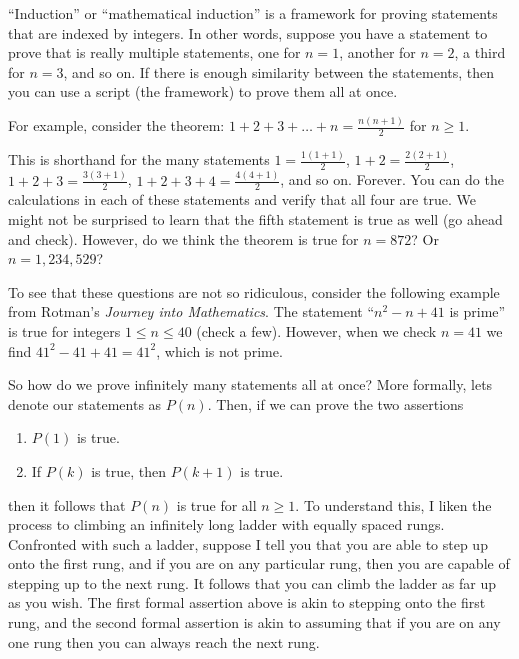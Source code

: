 \begin{para}``Induction'' or ``mathematical induction'' is a framework for proving statements that are indexed by integers.  In other words, suppose you have a statement to prove that is really multiple statements, one for $n=1$, another for $n=2$, a third for $n=3$, and so on.  If there is enough similarity between the statements, then you can use a script (the framework) to prove them all at once.\end{para}
%
\begin{para}For example, consider the theorem: $1+2+3+\dots+n=\displaystyle\frac{n(n+1)}{2}$ for $n\geq 1$.\end{para}
%
\begin{para}This is shorthand for the many statements $1=\frac{1(1+1)}{2}$, $1+2=\frac{2(2+1)}{2}$, $1+2+3=\frac{3(3+1)}{2}$, $1+2+3+4=\frac{4(4+1)}{2}$, and so on.  Forever.  You can do the calculations in each of these statements and verify that all four are true.  We might not be surprised to learn that the fifth statement is true as well (go ahead and check).  However, do we think the theorem is true for $n=872$?  Or $n=1,234,529$?\end{para}
%
\begin{para}To see that these questions are not so ridiculous, consider the following example from Rotman's {\sl Journey into Mathematics}.  The statement ``$n^{2}-n+41$ is prime'' is true for integers  $1\leq n\leq 40$ (check a few).  However, when we check $n=41$ we find $41^2-41+41=41^2$, which is not prime.\end{para}
%
\begin{para}So how do we prove infinitely many statements all at once?  More formally, lets denote our statements as $P(n)$.  Then, if we can prove the two assertions
%
\begin{enumerate}
\item $P(1)$ is true.
\item If $P(k)$ is true, then $P(k+1)$ is true.
\end{enumerate}
%
then it follows that $P(n)$ is true for all $n\geq 1$.  To understand this, I liken the process to climbing an infinitely long ladder with equally spaced rungs.  Confronted with such a ladder, suppose I tell you that you are able to step up onto the first rung, and if you are on any particular rung, then you are capable of stepping up to the next rung.  It follows that you can climb the ladder as far up as you wish.  The first formal assertion above is akin to stepping onto the first rung, and the second formal assertion is akin to assuming that if you are on any one rung then you can always reach the next rung.\end{para}
